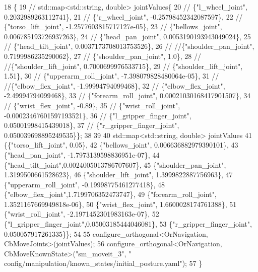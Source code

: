\begin{DoxyCode}
18     \{
19         \textcolor{comment}{// std::map<std::string, double> jointValues\{}
20         \textcolor{comment}{//     \{"l\_wheel\_joint", 0.2032989263112741\},}
21         \textcolor{comment}{//     \{"r\_wheel\_joint", -0.25798452342087597\},}
22         \textcolor{comment}{//     \{"torso\_lift\_joint", -1.2577603815717127e-05\},}
23         \textcolor{comment}{//     \{"bellows\_joint", 0.006785193726937263\},}
24         \textcolor{comment}{//     \{"head\_pan\_joint", 0.0053190193943049024\},}
25         \textcolor{comment}{//     \{"head\_tilt\_joint", 0.0037173708013753526\},}
26         \textcolor{comment}{//     //\{"shoulder\_pan\_joint", 0.7199986235290062\},}
27         \textcolor{comment}{//     \{"shoulder\_pan\_joint", 1.0\},}
28         \textcolor{comment}{//     //\{"shoulder\_lift\_joint", 0.7000699976533715\},}
29         \textcolor{comment}{//     \{"shoulder\_lift\_joint", 1.51\},}
30         \textcolor{comment}{//     \{"upperarm\_roll\_joint", -7.398079828480064e-05\},}
31         \textcolor{comment}{//     //\{"elbow\_flex\_joint", -1.99994794099468\},}
32         \textcolor{comment}{//     \{"elbow\_flex\_joint", -2.49994794099468\},}
33         \textcolor{comment}{//     \{"forearm\_roll\_joint", 0.00021030168417901507\},}
34         \textcolor{comment}{//     \{"wrist\_flex\_joint", -0.89\},}
35         \textcolor{comment}{//     \{"wrist\_roll\_joint", -0.00023467601597193521\},}
36         \textcolor{comment}{//     \{"l\_gripper\_finger\_joint", 0.05001998415439018\},}
37         \textcolor{comment}{//     \{"r\_gripper\_finger\_joint", 0.050039698895249535\}\};}
38 
39 
40     std::map<std::string, double> jointValues
41        \{\{\textcolor{stringliteral}{"torso\_lift\_joint"}, 0.05\},
42         \{\textcolor{stringliteral}{"bellows\_joint"}, 0.006636882979390101\},
43         \{\textcolor{stringliteral}{"head\_pan\_joint"}, -1.7973139598836951e-07\},
44         \{\textcolor{stringliteral}{"head\_tilt\_joint"},0.0024005013786707607\},
45         \{\textcolor{stringliteral}{"shoulder\_pan\_joint"}, 1.3199500661528623\},
46         \{\textcolor{stringliteral}{"shoulder\_lift\_joint"}, 1.3999822887756963\},
47         \{\textcolor{stringliteral}{"upperarm\_roll\_joint"}, -0.19998775461277418\},
48         \{\textcolor{stringliteral}{"elbow\_flex\_joint"},1.7199706352473747\},
49         \{\textcolor{stringliteral}{"forearm\_roll\_joint"}, 1.3521167669949818e-06\},
50         \{\textcolor{stringliteral}{"wrist\_flex\_joint"}, 1.6600028174761388\},
51         \{\textcolor{stringliteral}{"wrist\_roll\_joint"}, -2.1971452301983163e-07\},
52         \{\textcolor{stringliteral}{"l\_gripper\_finger\_joint"},0.05003185444046081\},
53         \{\textcolor{stringliteral}{"r\_gripper\_finger\_joint"}, 0.050057917261335\}\};
54 
55         configure\_orthogonal<OrNavigation, CbMoveJoints>(jointValues);
56         configure\_orthogonal<OrNavigation, CbMoveKnownState>(\textcolor{stringliteral}{"sm\_moveit\_3"}, \textcolor{stringliteral}{"
      config/manipulation/known\_states/initial\_posture.yaml"});
57     \}
\end{DoxyCode}


